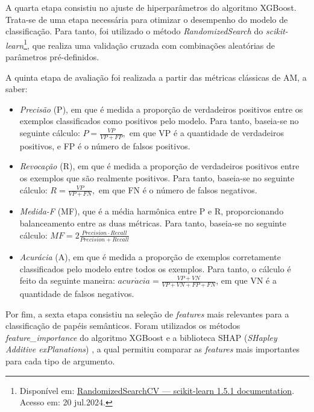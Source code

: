 A quarta etapa consistiu no ajuste de hiperparâmetros do algoritmo
XGBoost. Trata-se de uma etapa necessária para otimizar o desempenho do
modelo de classificação. Para tanto, foi utilizado o método
\emph{RandomizedSearch} do \emph{scikit-learn}\footnote{Disponível em:
  \href{https://scikit-learn.org/stable/modules/generated/sklearn.model_selection.RandomizedSearchCV.html}{RandomizedSearchCV
  --- scikit-learn 1.5.1 documentation}. Acesso em: 20 jul.2024.}, que
realiza uma validação cruzada com combinações aleatórias de parâmetros
pré-definidos.

A quinta etapa de avaliação foi realizada a partir das métricas
clássicas de AM, a saber:

\begin{itemize}
\item
  \emph{Precisão} (P), em que é medida a proporção de verdadeiros
  positivos entre os exemplos classificados como positivos pelo modelo.
  Para tanto, baseia-se no seguinte cálculo: \(P = \frac{VP}{VP + FP},\)
  em que VP é a quantidade de verdadeiros positivos, e FP é o número de
  falsos positivos.
\item
  \emph{Revocação} (R), em que é medida a proporção de verdadeiros
  positivos entre os exemplos que são realmente positivos. Para tanto,
  baseia-se no seguinte cálculo: \(R = \frac{VP}{VP + FN},\) em que FN é
  o número de falsos negativos.
\item
  \emph{Medida-F} (MF), que é a média harmônica entre P e R,
  proporcionando balanceamento entre as duas métricas. Para tanto,
  baseia-se no seguinte cálculo:
  \(MF = 2\frac{Precision \cdot Recall}{Precision + Recall}\)
\item
  \emph{Acurácia} (A), em que é medida a proporção de exemplos
  corretamente classificados pelo modelo entre todos os exemplos. Para
  tanto, o cálculo é feito da seguinte maneira:
  \(acur\acute{a}cia = \frac{VP + VN}{VP + VN + FP + FN}\), em que VN é a
  quantidade de falsos negativos.
\end{itemize}

Por fim, a sexta etapa consistiu na seleção de \emph{features} mais
relevantes para a classificação de papéis semânticos. Foram utilizados
os métodos \emph{feature\_importance} do algoritmo XGBoost e a
biblioteca SHAP (\emph{SHapley Additive exPlanations}) \cite{lundberg2017}, a qual permitiu comparar as \emph{features} mais importantes para
cada tipo de argumento.